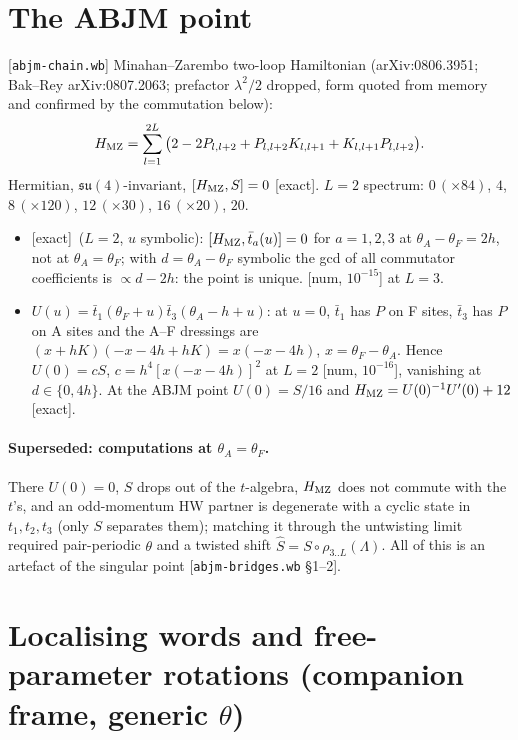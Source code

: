 \documentclass[11pt]{article}
\newcommand{\tb}{\bar t}
\newcommand{\HMZ}{H_{\rm MZ}}
\newcommand{\nb}[1]{\texttt{#1}}
\newcommand{\ex}{\textsf{[exact]}}
\newcommand{\num}[1]{\textsf{[num, $#1$]}}
\begin{document}
\section{The ABJM point}\label{sec:abjm}

[\nb{abjm-chain.wb}] Minahan--Zarembo two-loop Hamiltonian (arXiv:0806.3951; Bak--Rey arXiv:0807.2063; prefactor
$\lambda^2/2$ dropped, form quoted from memory and confirmed by the commutation below):
\begin{equation}
 \HMZ=\sum_{l=1}^{2L}\big(2-2P_{l,l+2}+P_{l,l+2}K_{l,l+1}+K_{l,l+1}P_{l,l+2}\big).
\end{equation}
Hermitian, $\mathfrak{su}(4)$-invariant, $[\HMZ,S]=0$ \ex. $L=2$ spectrum: $0\,(\times84)$, $4$, $8\,(\times120)$,
$12\,(\times30)$, $16\,(\times20)$, $20$.
\begin{itemize}
\item \ex\ ($L=2$, $u$ symbolic): $[\HMZ,\tb_a(u)]=0$ for $a=1,2,3$ at $\theta_A-\theta_F=2h$, not at $\theta_A=\theta_F$;
with $d=\theta_A-\theta_F$ symbolic the gcd of all commutator coefficients is $\propto d-2h$: the point is unique.
\num{10^{-15}} at $L=3$.
\item $U(u)=\tb_1(\theta_F+u)\tb_3(\theta_A-h+u)$: at $u=0$, $\tb_1$ has $P$ on F sites, $\tb_3$ has $P$ on A sites and the
A--F dressings are $(x+hK)(-x-4h+hK)=x(-x-4h)$, $x=\theta_F-\theta_A$. Hence $U(0)=cS$, $c=h^4[x(-x-4h)]^2$ at $L=2$
\num{10^{-16}}, vanishing at $d\in\{0,4h\}$. At the ABJM point $U(0)=S/16$ and $\HMZ=U(0)^{-1}U'(0)+12$ \ex.
\end{itemize}

\paragraph{Superseded: computations at $\theta_A=\theta_F$.} There $U(0)=0$, $S$ drops out of the $t$-algebra, $\HMZ$ does not
commute with the $t$'s, and an odd-momentum HW partner is degenerate with a cyclic state in $t_1,t_2,t_3$
(only $S$ separates them); matching it through the untwisting limit required pair-periodic $\theta$ and a twisted shift
$\hat S=S\circ\rho_{3..L}(\Lambda)$. All of this is an artefact of the singular point [\nb{abjm-bridges.wb} \S1--2].

\section{Localising words and free-parameter rotations (companion frame, generic $\theta$)}\label{sec:loc}
\end{document}
